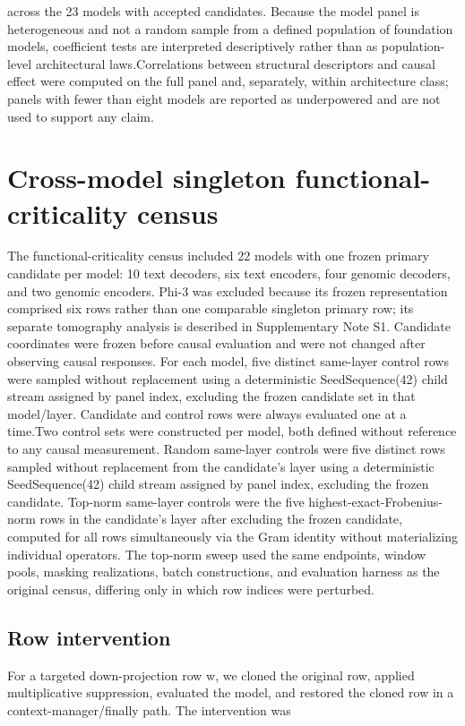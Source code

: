 \documentclass[11pt]{article}
\begin{document}
across the 23 models with accepted candidates. Because the model panel is heterogeneous and not a random sample from a defined population of foundation models, coefficient tests are interpreted descriptively rather than as population-level architectural laws.Correlations between structural descriptors and causal effect were computed on the full panel and, separately, within architecture class; panels with fewer than eight models are reported as underpowered and are not used to support any claim.

\section*{Cross-model singleton functional-criticality census}
The functional-criticality census included 22 models with one frozen primary candidate per model: 10 text decoders, six text encoders, four genomic decoders, and two genomic encoders. Phi-3 was excluded because its frozen representation comprised six rows rather than one comparable singleton primary row; its separate tomography analysis is described in Supplementary Note S1.  Candidate coordinates were frozen before causal evaluation and were not changed after observing causal responses. For each model, five distinct same-layer control rows were sampled without replacement using a deterministic SeedSequence(42) child stream assigned by panel index, excluding the frozen candidate set in that model/layer. Candidate and control rows were always evaluated one at a time.Two control sets were constructed per model, both defined without reference to any causal measurement. Random same-layer controls were five distinct rows sampled without replacement from the candidate’s layer using a deterministic SeedSequence(42) child stream assigned by panel index, excluding the frozen candidate. Top-norm same-layer controls were the five highest-exact-Frobenius-norm rows in the candidate’s layer after excluding the frozen candidate, computed for all rows simultaneously via the Gram identity without materializing individual operators. The top-norm sweep used the same endpoints, window pools, masking realizations, batch constructions, and evaluation harness as the original census, differing only in which row indices were perturbed.

\subsection*{Row intervention}
For a targeted down-projection row w, we cloned the original row, applied multiplicative suppression, evaluated the model, and restored the cloned row in a context-manager/finally path. The intervention was
\end{document}
